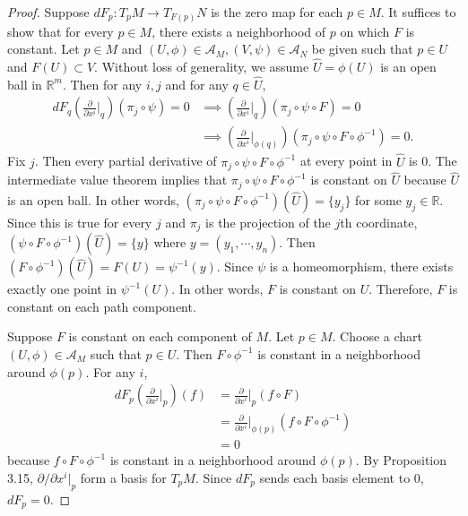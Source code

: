 \begin{proof}
  Suppose $dF_p: T_pM \rightarrow T_{F(p)}N$ is the zero map for each $p \in M$.
  It suffices to show that for every $p \in M$, there exists a neighborhood of $p$ on which $F$ is constant.
  Let $p \in M$ and $(U, \phi) \in \mathcal{A}_M, (V, \psi) \in \mathcal{A}_N$ be given such that $p \in U$ and $F(U) \subset V$.
  Without loss of generality, we assume $\hat{U} = \phi(U)$ is an open ball in $\mathbb{R}^m$.
  Then for any $i, j$ and for any $q \in \hat{U}$,
  \begin{align*}
    dF_q(\frac{\partial}{\partial x^i}\vert_q)(\pi_j \circ \psi) = 0
      &\implies (\frac{\partial}{\partial x^i}\vert_q)(\pi_j \circ \psi \circ F) = 0 \\
      &\implies (\frac{\partial}{\partial x^i}\vert_{\phi(q)})(\pi_j \circ \psi \circ F \circ \phi^{-1}) = 0.
  \end{align*}
  Fix $j$.
  Then every partial derivative of $\pi_j \circ \psi \circ F \circ \phi^{-1}$ at every point in $\hat{U}$ is 0.
  The intermediate value theorem implies that $\pi_j \circ \psi \circ F \circ \phi^{-1}$ is constant on $\hat{U}$ because $\hat{U}$ is an open ball.
  In other words, $(\pi_j \circ \psi \circ F \circ \phi^{-1})(\hat{U}) = \{ y_j \}$ for some $y_j \in \mathbb{R}$.
  Since this is true for every $j$ and $\pi_j$ is the projection of the $j$th coordinate, $(\psi \circ F \circ \phi^{-1})(\hat{U}) = \{ y \}$ where $y = (y_1, \cdots, y_n)$.
  Then $(F \circ \phi^{-1})(\hat{U}) = F(U) = \psi^{-1}(y)$.
  Since $\psi$ is a homeomorphism, there exists exactly one point in $\psi^{-1}(U)$.
  In other words, $F$ is constant on $U$.
  Therefore, $F$ is constant on each path component.

  Suppose $F$ is constant on each component of $M$.
  Let $p \in M$.
  Choose a chart $(U, \phi) \in \mathcal{A}_M$ such that $p \in U$.
  Then $F \circ \phi^{-1}$ is constant in a neighborhood around $\phi(p)$.
  For any $i$,
  \begin{align*}
    dF_p(\frac{\partial}{\partial x^i}\vert_p)(f)
      &= \frac{\partial}{\partial x^i}\vert_p(f \circ F) \\
      &= \frac{\partial}{\partial x^i}\vert_{\phi(p)}(f \circ F \circ \phi^{-1}) \\
      &= 0
  \end{align*}
  because $f \circ F \circ \phi^{-1}$ is constant in a neighborhood around $\phi(p)$.
  By Proposition 3.15, $\partial / \partial x^i\vert_p$ form a basis for $T_pM$.
  Since $dF_p$ sends each basis element to 0, $dF_p = 0$.
\end{proof}

